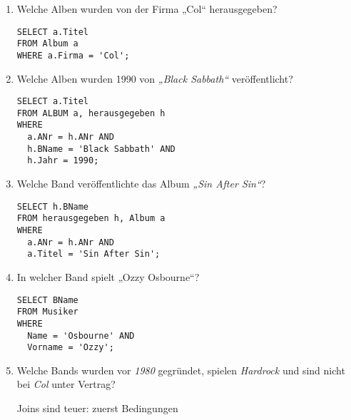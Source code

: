 \documentclass{lehramt-informatik-aufgabe}
\begin{document}
\begin{enumerate}


\item Welche Alben wurden von der Firma „Col“ herausgegeben?

\begin{antwort}[muster]
\begin{verbatim}
SELECT a.Titel
FROM Album a
WHERE a.Firma = 'Col';
\end{verbatim}
\end{antwort}


\item Welche Alben wurden 1990 von \emph{„Black Sabbath“}
veröffentlicht?

\begin{antwort}[muster]
\begin{verbatim}
SELECT a.Titel
FROM ALBUM a, herausgegeben h
WHERE
  a.ANr = h.ANr AND
  h.BName = 'Black Sabbath' AND
  h.Jahr = 1990;
\end{verbatim}
\end{antwort}


\item Welche Band veröffentlichte das Album \emph{„Sin After Sin“}?

\begin{antwort}[muster]
\begin{verbatim}
SELECT h.BName
FROM herausgegeben h, Album a
WHERE
  a.ANr = h.ANr AND
  a.Titel = 'Sin After Sin';
\end{verbatim}
\end{antwort}


\item In welcher Band spielt „Ozzy Osbourne“?

\begin{antwort}[muster]
\begin{verbatim}
SELECT BName
FROM Musiker
WHERE
  Name = 'Osbourne' AND
  Vorname = 'Ozzy';
\end{verbatim}
\end{antwort}


\item Welche Bands wurden vor \emph{1980} gegründet, spielen
\emph{Hardrock} und sind nicht bei \emph{Col} unter Vertrag?

\begin{antwort}[muster]
Joins sind teuer: zuerst Bedingungen


\end{antwort}
\end{enumerate}
\end{document}
